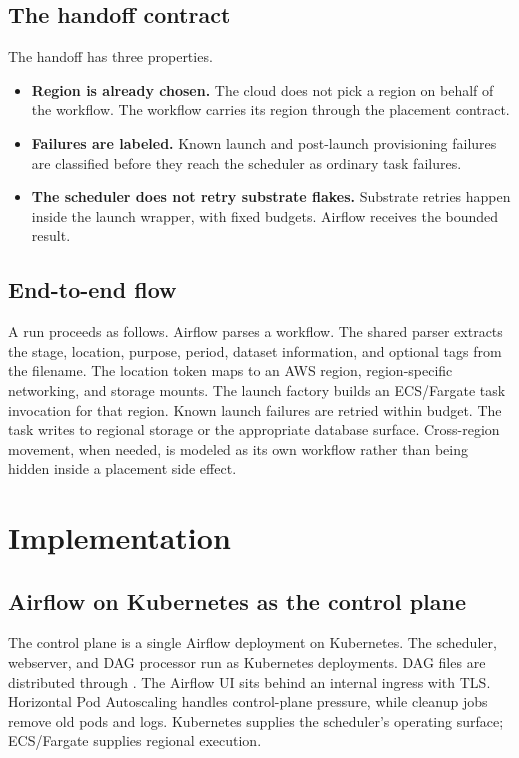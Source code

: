 \documentclass[11pt, reqno]{amsart}
\newcommand{\code}[1]{\texttt{\detokenize{#1}}}
\begin{document}
\subsection{The handoff contract}

The handoff has three properties.
\begin{itemize}
  \item \textbf{Region is already chosen.} The cloud does not pick a region on behalf of the workflow. The workflow carries its region through the placement contract.
  \item \textbf{Failures are labeled.} Known launch and post-launch provisioning failures are classified before they reach the scheduler as ordinary task failures.
  \item \textbf{The scheduler does not retry substrate flakes.} Substrate retries happen inside the launch wrapper, with fixed budgets. Airflow receives the bounded result.
\end{itemize}

\subsection{End-to-end flow}

A run proceeds as follows. Airflow parses a workflow. The shared parser extracts the stage, location, purpose, period, dataset information, and optional tags from the filename. The location token maps to an AWS region, region-specific networking, and storage mounts. The launch factory builds an ECS/Fargate task invocation for that region. Known launch failures are retried within budget. The task writes to regional storage or the appropriate database surface. Cross-region movement, when needed, is modeled as its own workflow rather than being hidden inside a placement side effect.

\section{Implementation}
\label{sec:implementation}

\subsection{Airflow on Kubernetes as the control plane}

The control plane is a single Airflow deployment on Kubernetes. The scheduler, webserver, and DAG processor run as Kubernetes deployments. DAG files are distributed through \code{git-sync}. The Airflow UI sits behind an internal ingress with TLS. Horizontal Pod Autoscaling handles control-plane pressure, while cleanup jobs remove old pods and logs. Kubernetes supplies the scheduler's operating surface; ECS/Fargate supplies regional execution.
\end{document}
